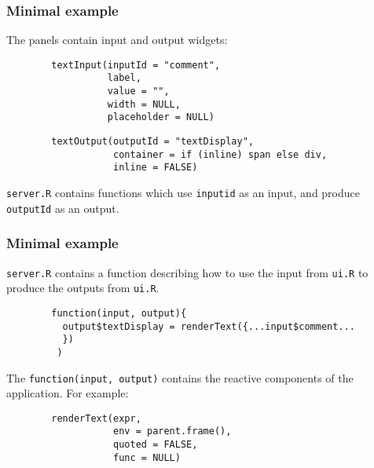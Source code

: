 \documentclass{beamer}
\begin{document}
	\begin{frame}[fragile]
		\frametitle{Minimal example}

		The panels contain input and output widgets:

		\vspace{1em}
		
		\begin{exampleblock}{}
		\begin{BVerbatim}
		textInput(inputId = "comment",
		          label,
		          value = "",
		          width = NULL,
		          placeholder = NULL)
		\end{BVerbatim}
		\end{exampleblock}{}

		\vspace{1em}

		\begin{exampleblock}{}
		\begin{BVerbatim}
		textOutput(outputId = "textDisplay",
		           container = if (inline) span else div,
		           inline = FALSE)
		\end{BVerbatim}
		\end{exampleblock}{}

		\vspace{1em}

		\verb|server.R| contains functions which use \verb|inputid|	as an input, and produce \verb|outputId| as an output.

	\end{frame}

	\begin{frame}[fragile]
		\frametitle{Minimal example}

		\verb|server.R| contains a function describing how to use the input from \verb|ui.R| to produce the outputs from \verb|ui.R|.

		\vspace{1em}
		
		\begin{exampleblock}{}
		\begin{BVerbatim}
		function(input, output){
		  output$textDisplay = renderText({...input$comment...
		  })
		 )
		\end{BVerbatim}
		\end{exampleblock}{}

		\vspace{1em}

		The \verb|function(input, output)| contains the reactive components of the application. For example:
		
		\begin{exampleblock}{}
		\begin{BVerbatim}
		renderText(expr,
		           env = parent.frame(),
		           quoted = FALSE,
		           func = NULL)
		\end{BVerbatim}
		\end{exampleblock}{}

	\end{frame}
\end{document}

